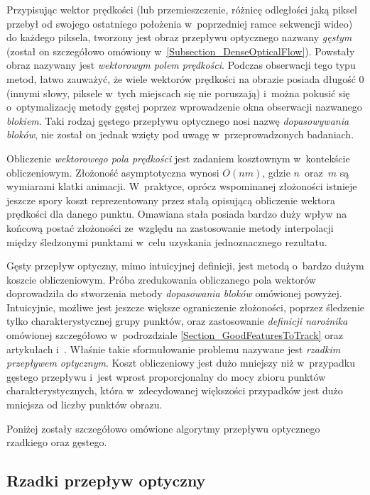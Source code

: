       Przypisując wektor prędkości (lub przemieszczenie, różnicę odległości jaką piksel przebył od swojego ostatniego położenia w~poprzedniej ramce sekwencji wideo) do każdego piksela, tworzony jest obraz przepływu optycznego nazwany \textit{gęstym} (został on szczegółowo omówiony w~\ref{Subsection_DenseOpticalFlow}). Powstały obraz nazywany jest \textit{wektorowym polem prędkości}. Podczas obserwacji tego typu metod, łatwo zauważyć, że wiele wektorów prędkości na obrazie posiada długość $0$ (innymi słowy, piksele w~tych miejscach się nie poruszają) i~można pokusić się o~optymalizację metody gęstej poprzez wprowadzenie okna obserwacji nazwanego \textit{blokiem}. Taki rodzaj gęstego przepływu optycznego nosi nazwę \textit{dopasowywania bloków}, nie został on jednak wzięty pod uwagę w~przeprowadzonych badaniach.

      Obliczenie \textit{wektorowego pola prędkości} jest zadaniem kosztownym w~kontekście obliczeniowym. Złożoność asymptotyczna wynosi $O(nm)$, gdzie $n$~oraz~$m$ są wymiarami klatki animacji. W~praktyce, oprócz wspominanej złożoności istnieje jeszcze spory koszt reprezentowany przez stałą opisującą obliczenie wektora prędkości dla danego punktu. Omawiana stała posiada bardzo duży wpływ na końcową postać złożoności ze~względu na zastosowanie metody interpolacji między śledzonymi punktami w~celu uzyskania jednoznacznego rezultatu.

      Gęsty przepływ optyczny, mimo intuicyjnej definicji, jest metodą o~bardzo dużym koszcie obliczeniowym. Próba zredukowania obliczanego pola wektorów doprowadziła do stworzenia metody \textit{dopasowania bloków} omówionej powyżej. Intuicyjnie, możliwe jest jeszcze większe ograniczenie złożoności, poprzez śledzenie tylko charakterystycznej grupy punktów, oraz zastosowanie \textit{definicji narożnika} omówionej szczegółowo w~podrozdziale \ref{Section_GoodFeaturesToTrack} oraz artykułach \cite{LucasKanadeTracker81} i~\cite{GoodFeaturesToTrack94}. Właśnie takie sformułowanie problemu nazywane jest \textit{rzadkim przepływem optycznym}. Koszt obliczeniowy jest dużo mniejszy niż w~przypadku gęstego przepływu i~jest wprost proporcjonalny do mocy zbioru punktów charakterystycznych, która w~zdecydowanej większości przypadków jest dużo mniejsza od liczby punktów obrazu.

      Poniżej zostały szczegółowo omówione algorytmy przepływu optycznego rzadkiego oraz gęstego.

    \subsection{Rzadki przepływ optyczny}

